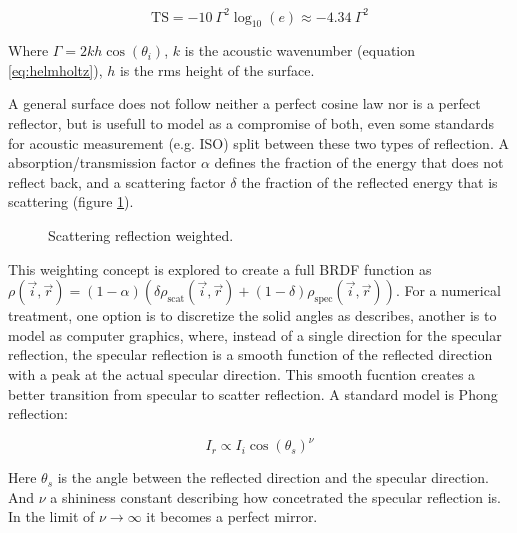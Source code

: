 \begin{equation*}
\text{TS} = -10~\Gamma^2\log_{10}(e) \approx -4.34~\Gamma^2
\end{equation*}

Where $\Gamma = 2kh\cos(\theta_i)$, $k$ is the acoustic wavenumber (equation
\ref{eq:helmholtz}), $h$ is the rms height of the surface.

A general surface does not follow neither a perfect cosine law nor is a perfect
reflector, but is usefull to model as a compromise of
both\cite{cox2006tutorial,vorlander2000definition}, even some standards for
acoustic measurement (e.g. ISO) split between these two types of
reflection\cite{rindel2001scattering}. A absorption/transmission factor $\alpha$
defines the fraction of the energy that does not reflect back, and a scattering
factor $\delta$ the fraction of the reflected energy that is scattering (figure
\ref{fig:scatter}).

\begin{figure}[h]
	\centering
	
	\caption{Scattering reflection weighted.}
	\label{fig:scatter}
\end{figure}

This weighting concept is explored to create a full BRDF function as
$\rho(\vec{i},\vec{r}) = (1-\alpha)(\delta \rho_\text{scat}(\vec{i},\vec{r}) +
(1-\delta) \rho_\text{spec}(\vec{i},\vec{r}) )$. For a numerical treatment, one
option is to discretize the solid angles as \citet{siltanen2007room} describes,
another is to model as computer graphics, where, instead of a single direction
for the specular reflection, the specular reflection is a smooth function of the
reflected direction with a peak at the actual specular direction. This smooth
fucntion creates a better transition from specular to scatter reflection. A
standard model is Phong reflection\cite{phong1975illumination}:

\begin{equation}
\label{eq:phong}
I_r \propto	 I_i \cos(\theta_s)^\nu
\end{equation} 

Here $\theta_s$ is the angle between the reflected direction and the specular
direction. And $\nu$ a shininess constant describing how concetrated the
specular reflection is. In the limit of $\nu \to \infty$ it becomes a perfect mirror.


